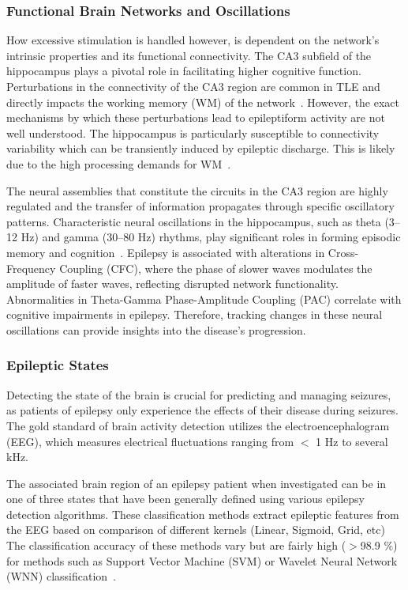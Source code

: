 \subsubsection{Functional Brain Networks and Oscillations}
How excessive stimulation is handled however, is dependent on the network's intrinsic properties and its functional connectivity.
The CA3 subfield of the hippocampus plays a pivotal role in facilitating higher cognitive function.
Perturbations in the connectivity of the CA3 region are common in TLE and directly impacts the working memory (WM)
of the network~\parencite{arskiOscillatoryBasisWorking2021}. However, the exact mechanisms by which these perturbations lead to epileptiform
activity are not well understood. The hippocampus is particularly susceptible to connectivity variability which can be transiently induced by epileptic discharge.
This is likely due to the high processing demands for WM~\parencite{aldenkampEffectsEpileptiformEEG2004}.

The neural assemblies that constitute the circuits in the CA3 region are highly regulated and the transfer of
information propagates through specific oscillatory patterns.
Characteristic neural oscillations in the hippocampus, such as theta (3--12 Hz)
and gamma (30--80 Hz) rhythms, play significant roles in forming episodic memory and cognition~\parencite{nyhusFunctionalRoleGamma2010}.
Epilepsy is associated with alterations in Cross-Frequency Coupling (CFC), where
the phase of slower waves modulates the amplitude of faster waves, reflecting
disrupted network functionality. Abnormalities in Theta-Gamma Phase-Amplitude
Coupling (PAC) correlate with cognitive impairments in epilepsy. Therefore, tracking changes
in these neural oscillations can provide insights into the disease's progression.

\subsubsection{Epileptic States}
Detecting the state of the brain is crucial for predicting and managing seizures, as patients of epilepsy
only experience the effects of their disease during seizures.
The gold standard of brain activity detection utilizes the electroencephalogram (EEG),
which measures electrical fluctuations ranging from \(<\) 1 Hz to several kHz.

The associated brain region of an epilepsy patient when investigated can be in one of three states that have been generally defined using
various epilepsy detection algorithms. These classification methods extract epileptic features from the EEG based on comparison of
different kernels (Linear, Sigmoid, Grid, etc) The classification accuracy of these methods vary but are fairly high (\(>\)98.9 \%) for methods such as
Support Vector Machine (SVM) or Wavelet Neural Network (WNN) classification~\parencite{yayikEpilepticStateDetection2015}.
\pagebreak

